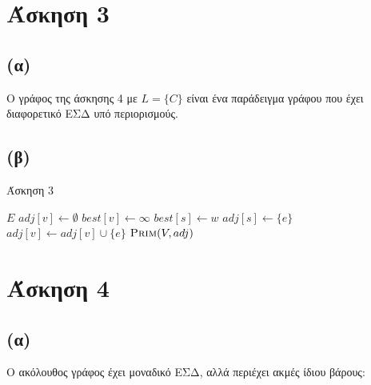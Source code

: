 \documentclass[11pt,a4paper]{book}
\begin{document}
\section*{Άσκηση 3}
\subsection*{(α)}
Ο γράφος της άσκησης 4 με $L = \{ C \}$ είναι ένα παράδειγμα γράφου που έχει διαφορετικό ΕΣΔ υπό περιορισμούς.

\subsection*{(β)}
\begin{algorithm}[H]
\caption{\textgreek{Άσκηση 3}}
\begin{algorithmic}[1]

	    \State \Return $E$
	\EndIf
        \State $adj[ v ] \gets \emptyset$
        \State $best[ v ] \gets \infty$
    \EndFor
            		    \State $best[ s ] \gets w$
        	    	    \State $adj[ s ] \gets \{ e \}$
	    	        \EndIf
    	        \EndIf
        	\EndFor
        \Else
            \State $adj[ v ] \gets adj[ v ] \cup \{ e \}$
        \EndIf
    \EndFor
    \State \Return $\Call{Prim}{V, adj}$
\EndProcedure
\end{algorithmic}
\end{algorithm}

\section*{Άσκηση 4}
\subsection*{(α)}

Ο ακόλουθος γράφος έχει μοναδικό ΕΣΔ, αλλά περιέχει ακμές ίδιου βάρους:

\begin{figure}[ht]
	\centering
\end{figure}
\end{document}
